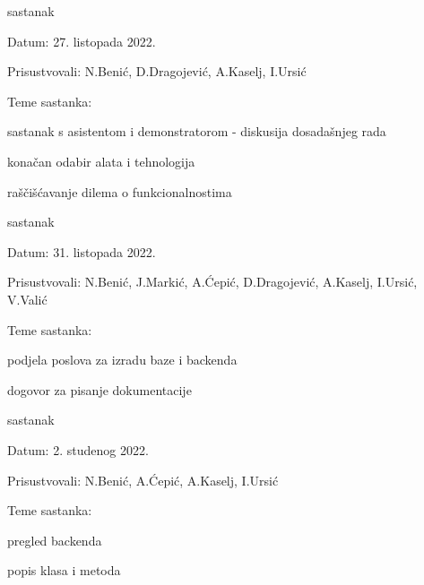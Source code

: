 \begin{packed_enum}
				\item  sastanak
				\item[] \begin{packed_item}
					\item Datum: 27. listopada 2022.
					\item Prisustvovali: N.Benić, D.Dragojević, A.Kaselj, I.Ursić
					\item Teme sastanka:
					\begin{packed_item}
						\item  sastanak s asistentom i demonstratorom - diskusija dosadašnjeg rada
						\item  konačan odabir alata i tehnologija
						\item  raščišćavanje dilema o funkcionalnostima
					\end{packed_item}
				\end{packed_item}
			
				\item  sastanak
				\item[] \begin{packed_item}
					\item Datum: 31. listopada 2022.
					\item Prisustvovali: N.Benić, J.Markić, A.Ćepić, D.Dragojević, A.Kaselj, I.Ursić, V.Valić
					\item Teme sastanka:
					\begin{packed_item}
						\item  podjela poslova za izradu baze i backenda
						\item  dogovor za pisanje dokumentacije
					\end{packed_item}
				\end{packed_item}
	
					\item  sastanak
				\item[] \begin{packed_item}
					\item Datum: 2. studenog 2022.
					\item Prisustvovali: N.Benić, A.Ćepić, A.Kaselj, I.Ursić
					\item Teme sastanka:
					\begin{packed_item}
						\item  pregled backenda
						\item  popis klasa i metoda
					\end{packed_item}
				\end{packed_item}
	

\end{packed_enum}
